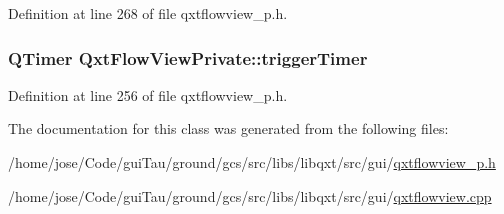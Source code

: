 Definition at line 268 of file qxtflowview\-\_\-p.\-h.

\hypertarget{class_qxt_flow_view_private_a94acb927e32ce075031ac1305e615464}{
\subsubsection[{trigger\-Timer}]{\setlength{\rightskip}{0pt plus 5cm}Q\-Timer Qxt\-Flow\-View\-Private\-::trigger\-Timer}}\label{class_qxt_flow_view_private_a94acb927e32ce075031ac1305e615464}


Definition at line 256 of file qxtflowview\-\_\-p.\-h.



The documentation for this class was generated from the following files\-:\begin{DoxyCompactItemize}
\item 
/home/jose/\-Code/gui\-Tau/ground/gcs/src/libs/libqxt/src/gui/\hyperlink{qxtflowview__p_8h}{qxtflowview\-\_\-p.\-h}\item 
/home/jose/\-Code/gui\-Tau/ground/gcs/src/libs/libqxt/src/gui/\hyperlink{qxtflowview_8cpp}{qxtflowview.\-cpp}\end{DoxyCompactItemize}
